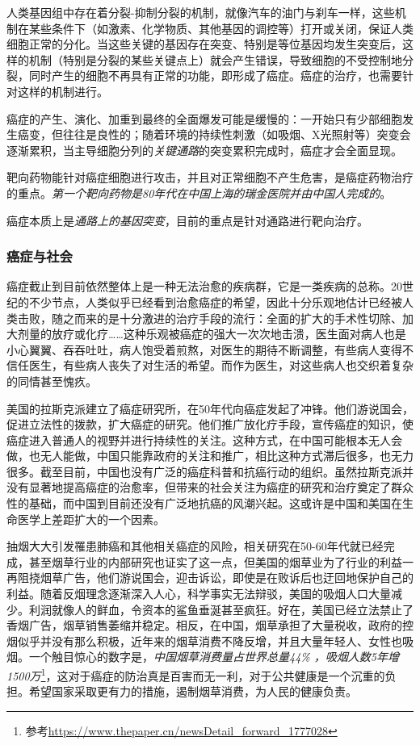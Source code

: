 \begin{itemize*}
	\item 人类基因组中存在着分裂-抑制分裂的机制，就像汽车的油门与刹车一样，这些机制在某些条件下（如激素、化学物质、其他基因的调控等）打开或关闭，保证人类细胞正常的分化。当这些关键的基因存在突变、特别是等位基因均发生突变后，这样的机制（特别是分裂的某些关键点上）就会产生错误，导致细胞的不受控制地分裂，同时产生的细胞不再具有正常的功能，即形成了癌症。癌症的治疗，也需要针对这样的机制进行。
	\item 癌症的产生、演化、加重到最终的全面爆发可能是缓慢的：一开始只有少部细胞发生癌变，但往往是良性的；随着环境的持续性刺激（如吸烟、X光照射等）突变会逐渐累积，当主导细胞分列的\emph{关键通路}的突变累积完成时，癌症才会全面显现。
	\item 靶向药物能针对癌症细胞进行攻击，并且对正常细胞不产生危害，是癌症药物治疗的重点。\emph{第一个靶向药物是80年代在中国上海的瑞金医院并由中国人完成的}。
	\item 癌症本质上是\emph{通路上的基因突变}，目前的重点是针对通路进行靶向治疗。
\end{itemize*}

\subsubsection{癌症与社会}
癌症截止到目前依然整体上是一种无法治愈的疾病群，它是一类疾病的总称。20世纪的不少节点，人类似乎已经看到治愈癌症的希望，因此十分乐观地估计已经被人类击败，随之而来的是十分激进的治疗手段的流行：全面的扩大的手术性切除、加大剂量的放疗或化疗……这种乐观被癌症的强大一次次地击溃，医生面对病人也是小心翼翼、吞吞吐吐，病人饱受着煎熬，对医生的期待不断调整，有些病人变得不信任医生，有些病人丧失了对生活的希望。而作为医生，对这些病人也交织着复杂的同情甚至愧疚。

美国的拉斯克派建立了癌症研究所，在50年代向癌症发起了冲锋。他们游说国会，促进立法性的拨款，扩大癌症的研究。他们推广放化疗手段，宣传癌症的知识，使癌症进入普通人的视野并进行持续性的关注。这种方式，在中国可能根本无人会做，也无人能做，中国只能靠政府的关注和推广，相比这种方式滞后很多，也无力很多。截至目前，中国也没有广泛的癌症科普和抗癌行动的组织。虽然拉斯克派并没有显著地提高癌症的治愈率，但带来的社会关注为癌症的研究和治疗奠定了群众性的基础，而中国到目前还没有广泛地抗癌的风潮兴起。这或许是中国和美国在生命医学上差距扩大的一个因素。

抽烟大大引发罹患肺癌和其他相关癌症的风险，相关研究在50-60年代就已经完成，甚至烟草行业的内部研究也证实了这一点，但美国的烟草业为了行业的利益一再阻挠烟草广告，他们游说国会，迎击诉讼，即使是在败诉后也迂回地保护自己的利益。随着反烟理念逐渐深入人心，科学事实无法辩驳，美国的吸烟人口大量减少。利润就像人的鲜血，令资本的鲨鱼垂涎甚至疯狂。好在，美国已经立法禁止了香烟广告，烟草销售萎缩并稳定。相反，在中国，烟草承担了大量税收，政府的控烟似乎并没有那么积极，近年来的烟草消费不降反增，并且大量年轻人、女性也吸烟。一个触目惊心的数字是，\emph{中国烟草消费量占世界总量44\% ，吸烟人数5年增1500万}\footnote{参考\url{https://www.thepaper.cn/newsDetail_forward_1777028}}，这对于癌症的防治真是百害而无一利，对于公共健康是一个沉重的负担。希望国家采取更有力的措施，遏制烟草消费，为人民的健康负责。

